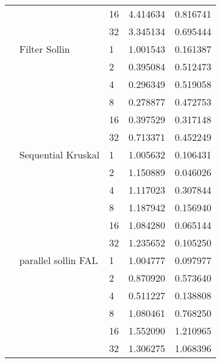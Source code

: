 \begin{tabular}{lllrr}
                                                       &                     & 16 &  4.414634 &  0.816741 \\
                                                       &                     & 32 &  3.345134 &  0.695444 \\
                                                       & Filter Sollin & 1  &  1.001543 &  0.161387 \\
                                                       &                     & 2  &  0.395084 &  0.512473 \\
                                                       &                     & 4  &  0.296349 &  0.519058 \\
                                                       &                     & 8  &  0.278877 &  0.472753 \\
                                                       &                     & 16 &  0.397529 &  0.317148 \\
                                                       &                     & 32 &  0.713371 &  0.452249 \\
                                                       & Sequential Kruskal & 1  &  1.005632 &  0.106431 \\
                                                       &                     & 2  &  1.150889 &  0.046026 \\
                                                       &                     & 4  &  1.117023 &  0.307844 \\
                                                       &                     & 8  &  1.187942 &  0.156940 \\
                                                       &                     & 16 &  1.084280 &  0.065144 \\
                                                       &                     & 32 &  1.235652 &  0.105250 \\
                                                       & parallel sollin FAL & 1  &  1.004777 &  0.097977 \\
                                                       &                     & 2  &  0.870920 &  0.573640 \\
                                                       &                     & 4  &  0.511227 &  0.138808 \\
                                                       &                     & 8  &  1.080461 &  0.768250 \\
                                                       &                     & 16 &  1.552090 &  1.210965 \\
                                                       &                     & 32 &  1.306275 &  1.068396 \\
\bottomrule
\end{tabular}
